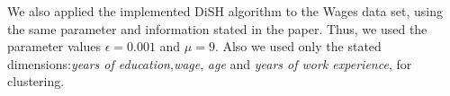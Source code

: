 \documentclass{article}
\begin{document}
We also applied the implemented DiSH algorithm to the Wages data set, using the same parameter and information stated in the paper. Thus, we used the parameter values $\epsilon = 0.001$ and $\mu = 9$. Also we used only the stated dimensions:\emph{years of education},\emph{wage}, \emph{age} and \emph{years of work experience}, for clustering. 

\begin{figure}[h!]
\centering
\end{figure}
\end{document}
